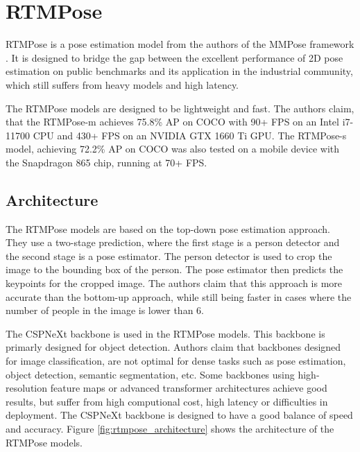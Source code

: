 \section{RTMPose}
\label{rtmpose}

RTMPose \cite{rtmpose} is a pose estimation model from the authors of the MMPose framework \cite{mmpose2020}. It is designed to bridge the gap between the excellent performance of 2D pose estimation on public benchmarks and its application in the industrial community, which still suffers from heavy models and high latency.

The RTMPose models are designed to be lightweight and fast. The authors claim, that the RTMPose-m achieves 75.8\% AP on COCO with 90+ FPS on an Intel i7-11700 CPU and 430+ FPS on an NVIDIA GTX 1660 Ti GPU. The RTMPose-s model, achieving 72.2\% AP on COCO was also tested on a mobile device with the Snapdragon 865 chip, running at 70+ FPS.

\subsection{Architecture}

The RTMPose models are based on the top-down pose estimation approach. They use a two-stage prediction, where the first stage is a person detector and the second stage is a pose estimator. The person detector is used to crop the image to the bounding box of the person. The pose estimator then predicts the keypoints for the cropped image. The authors claim that this approach is more accurate than the bottom-up approach, while still being faster in cases where the number of people in the image is lower than 6.

The CSPNeXt backbone is used in the RTMPose models. This backbone is primarly designed for object detection. Authors claim that backbones designed for image classification, are not optimal for dense tasks such as pose estimation, object detection, semantic segmentation, etc. Some backbones using high-resolution feature maps or advanced transformer architectures achieve good results, but suffer from high computional cost, high latency or difficulties in deployment. The CSPNeXt backbone is designed to have a good balance of speed and accuracy.
Figure \ref{fig:rtmpose_architecture} shows the architecture of the RTMPose models.


